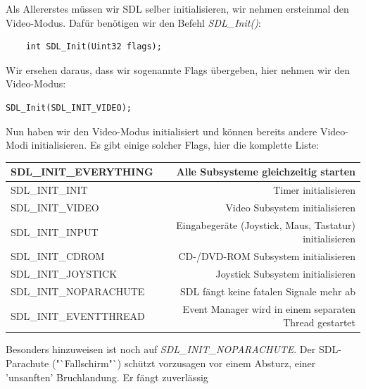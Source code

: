 \documentclass[b5paper,10pt,dvips,fleqn,titlepage,twoside]{book}
\begin{document}
Als Allererstes m\"{u}ssen wir SDL selber initialisieren, wir nehmen ersteinmal den Video-Modus.
Daf\"{u}r ben\"{o}tigen wir den Befehl \emph{SDL\_Init()}:
\begin{verbatim}
	int SDL_Init(Uint32 flags);
\end{verbatim}

Wir ersehen daraus, dass wir sogenannte Flags \"{u}bergeben, hier nehmen wir den Video-Modus:\newline
\begin{verbatim}
SDL_Init(SDL_INIT_VIDEO);
\end{verbatim}


Nun haben wir den Video-Modus initialisiert und k\"{o}nnen bereits andere Video-Modi initialisieren.
Es gibt einige solcher Flags, hier die komplette Liste:
\newline

\begin{tabular}{|l|r|}
\hline SDL\_INIT\_EVERYTHING & Alle Subsysteme gleichzeitig starten \\\hline
SDL\_INIT\_INIT & Timer initialisieren\\\hline
SDL\_INIT\_VIDEO & Video Subsystem initialisieren\\\hline
SDL\_INIT\_INPUT & Eingabeger\"{a}te (Joystick, Maus, Tastatur) initialisieren\\\hline
SDL\_INIT\_CDROM & CD-/DVD-ROM Subsystem initialisieren\\\hline
SDL\_INIT\_JOYSTICK & Joystick Subsystem initialisieren\\\hline
SDL\_INIT\_NOPARACHUTE & SDL fängt keine fatalen Signale mehr ab\\\hline
SDL\_INIT\_EVENTTHREAD & Event Manager wird in einem separaten Thread gestartet\\\hline
\end{tabular}\newline

Besonders hinzuweisen ist noch auf \emph{SDL\_INIT\_NOPARACHUTE}.
Der SDL-Parachute ("`Fallschirm"`) schützt vorzusagen vor einem Absturz, einer 'unsanften' Bruchlandung. Er fängt zuverlässig
\end{document}
